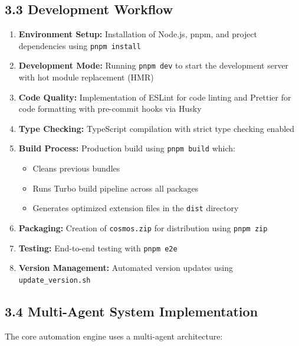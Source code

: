 \documentclass[12pt,a4paper]{article}
\begin{document}
\subsection*{\textbf{3.3 Development Workflow}}

\begin{enumerate}
    \item \textbf{Environment Setup:} Installation of Node.js, pnpm, and project dependencies using \texttt{pnpm install}
    
    \item \textbf{Development Mode:} Running \texttt{pnpm dev} to start the development server with hot module replacement (HMR)
    
    \item \textbf{Code Quality:} Implementation of ESLint for code linting and Prettier for code formatting with pre-commit hooks via Husky
    
    \item \textbf{Type Checking:} TypeScript compilation with strict type checking enabled
    
    \item \textbf{Build Process:} Production build using \texttt{pnpm build} which:
    \begin{itemize}
        \item Cleans previous bundles
        \item Runs Turbo build pipeline across all packages
        \item Generates optimized extension files in the \texttt{dist} directory
    \end{itemize}
    
    \item \textbf{Packaging:} Creation of \texttt{cosmos.zip} for distribution using \texttt{pnpm zip}
    
    \item \textbf{Testing:} End-to-end testing with \texttt{pnpm e2e}
    
    \item \textbf{Version Management:} Automated version updates using \texttt{update\_version.sh}
\end{enumerate}

\subsection*{\textbf{3.4 Multi-Agent System Implementation}}

The core automation engine uses a multi-agent architecture:
\end{document}
